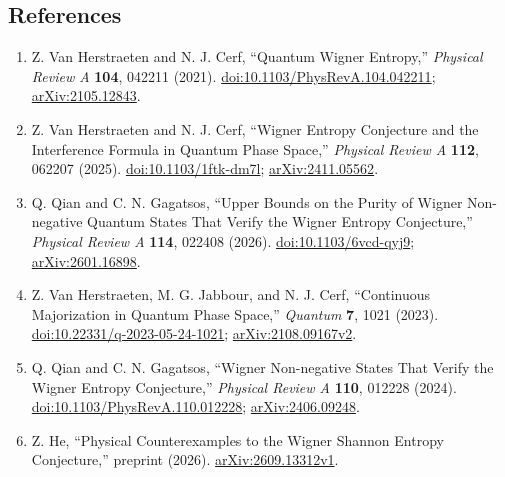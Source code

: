 \subsection*{References}

\begin{enumerate}[label={},leftmargin=4.8em,labelsep=0.5em]
  \footnotesize
  \item[\textup{[VHC21]}]\label{ref:wigner-original}
  Z. Van Herstraeten and N. J. Cerf, ``Quantum Wigner Entropy,'' \emph{Physical Review A} \textbf{104}, 042211 (2021). \href{https://doi.org/10.1103/PhysRevA.104.042211}{doi:10.1103/PhysRevA.104.042211}; \href{https://arxiv.org/abs/2105.12843}{arXiv:2105.12843}.

  \item[\textup{[VHC25]}]\label{ref:wigner-bs}
  Z. Van Herstraeten and N. J. Cerf, ``Wigner Entropy Conjecture and the Interference Formula in Quantum Phase Space,'' \emph{Physical Review A} \textbf{112}, 062207 (2025). \href{https://doi.org/10.1103/1ftk-dm7l}{doi:10.1103/1ftk-dm7l}; \href{https://arxiv.org/abs/2411.05562}{arXiv:2411.05562}.

  \item[\textup{[QG26]}]\label{ref:wigner-purity}
  Q. Qian and C. N. Gagatsos, ``Upper Bounds on the Purity of Wigner Non-negative Quantum States That Verify the Wigner Entropy Conjecture,'' \emph{Physical Review A} \textbf{114}, 022408 (2026). \href{https://doi.org/10.1103/6vcd-qyj9}{doi:10.1103/6vcd-qyj9}; \href{https://arxiv.org/abs/2601.16898}{arXiv:2601.16898}.

  \item[\textup{[VJC23]}]\label{ref:wigner-majorization}
  Z. Van Herstraeten, M. G. Jabbour, and N. J. Cerf, ``Continuous Majorization in Quantum Phase Space,'' \emph{Quantum} \textbf{7}, 1021 (2023). \href{https://doi.org/10.22331/q-2023-05-24-1021}{doi:10.22331/q-2023-05-24-1021}; \href{https://arxiv.org/abs/2108.09167v2}{arXiv:2108.09167v2}.

  \item[\textup{[QG24]}]\label{ref:wigner-qubits}
  Q. Qian and C. N. Gagatsos, ``Wigner Non-negative States That Verify the Wigner Entropy Conjecture,'' \emph{Physical Review A} \textbf{110}, 012228 (2024). \href{https://doi.org/10.1103/PhysRevA.110.012228}{doi:10.1103/PhysRevA.110.012228}; \href{https://arxiv.org/abs/2406.09248}{arXiv:2406.09248}.

  \item[\textup{[He26]}]\label{ref:wigner-counterexample}
  Z. He, ``Physical Counterexamples to the Wigner Shannon Entropy Conjecture,'' preprint (2026). \href{https://arxiv.org/abs/2609.13312v1}{arXiv:2609.13312v1}.
\end{enumerate}

